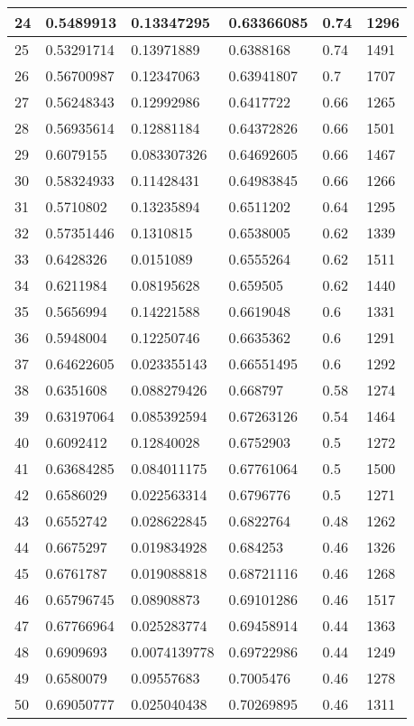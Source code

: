 \begin{longtable}{|l|l|l|l|l|l|}
24 & 0.5489913 & 0.13347295 & 0.63366085 & 0.74 & 1296 \\ \hline 
25 & 0.53291714 & 0.13971889 & 0.6388168 & 0.74 & 1491 \\ \hline 
26 & 0.56700987 & 0.12347063 & 0.63941807 & 0.7 & 1707 \\ \hline 
27 & 0.56248343 & 0.12992986 & 0.6417722 & 0.66 & 1265 \\ \hline 
28 & 0.56935614 & 0.12881184 & 0.64372826 & 0.66 & 1501 \\ \hline 
29 & 0.6079155 & 0.083307326 & 0.64692605 & 0.66 & 1467 \\ \hline 
30 & 0.58324933 & 0.11428431 & 0.64983845 & 0.66 & 1266 \\ \hline 
31 & 0.5710802 & 0.13235894 & 0.6511202 & 0.64 & 1295 \\ \hline 
32 & 0.57351446 & 0.1310815 & 0.6538005 & 0.62 & 1339 \\ \hline 
33 & 0.6428326 & 0.0151089 & 0.6555264 & 0.62 & 1511 \\ \hline 
34 & 0.6211984 & 0.08195628 & 0.659505 & 0.62 & 1440 \\ \hline 
35 & 0.5656994 & 0.14221588 & 0.6619048 & 0.6 & 1331 \\ \hline 
36 & 0.5948004 & 0.12250746 & 0.6635362 & 0.6 & 1291 \\ \hline 
37 & 0.64622605 & 0.023355143 & 0.66551495 & 0.6 & 1292 \\ \hline 
38 & 0.6351608 & 0.088279426 & 0.668797 & 0.58 & 1274 \\ \hline 
39 & 0.63197064 & 0.085392594 & 0.67263126 & 0.54 & 1464 \\ \hline 
40 & 0.6092412 & 0.12840028 & 0.6752903 & 0.5 & 1272 \\ \hline 
41 & 0.63684285 & 0.084011175 & 0.67761064 & 0.5 & 1500 \\ \hline 
42 & 0.6586029 & 0.022563314 & 0.6796776 & 0.5 & 1271 \\ \hline 
43 & 0.6552742 & 0.028622845 & 0.6822764 & 0.48 & 1262 \\ \hline 
44 & 0.6675297 & 0.019834928 & 0.684253 & 0.46 & 1326 \\ \hline 
45 & 0.6761787 & 0.019088818 & 0.68721116 & 0.46 & 1268 \\ \hline 
46 & 0.65796745 & 0.08908873 & 0.69101286 & 0.46 & 1517 \\ \hline 
47 & 0.67766964 & 0.025283774 & 0.69458914 & 0.44 & 1363 \\ \hline 
48 & 0.6909693 & 0.0074139778 & 0.69722986 & 0.44 & 1249 \\ \hline 
49 & 0.6580079 & 0.09557683 & 0.7005476 & 0.46 & 1278 \\ \hline 
50 & 0.69050777 & 0.025040438 & 0.70269895 & 0.46 & 1311 \\ \hline 
\end{longtable}